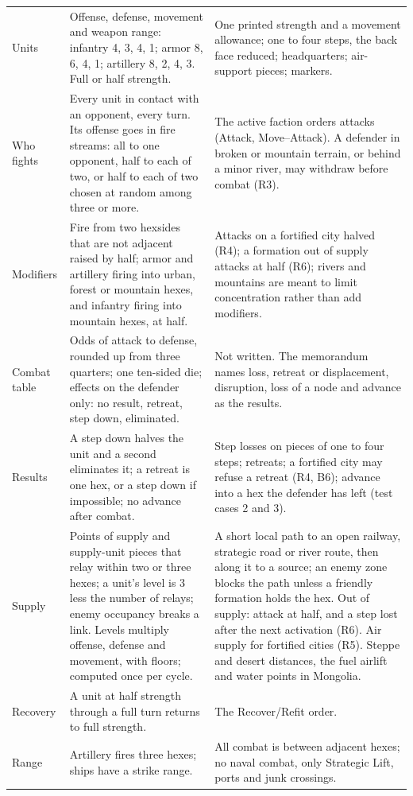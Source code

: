 \documentclass[11pt]{article}
\begin{document}
{\begin{longtable}{@{}>{\raggedright\arraybackslash}p{}>{\raggedright\arraybackslash}p{}>{\raggedright\arraybackslash}p{}@{}}
Units & Offense, defense, movement and weapon range: infantry 4, 3, 4, 1; armor 8, 6, 4, 1; artillery 8, 2, 4, 3. Full or half strength. & One printed strength and a movement allowance; one to four steps, the back face reduced; headquarters; air-support pieces; markers. \\
Who fights & Every unit in contact with an opponent, every turn. Its offense goes in fire streams: all to one opponent, half to each of two, or half to each of two chosen at random among three or more. & The active faction orders attacks (Attack, Move--Attack). A defender in broken or mountain terrain, or behind a minor river, may withdraw before combat (R3). \\
Modifiers & Fire from two hexsides that are not adjacent raised by half; armor and artillery firing into urban, forest or mountain hexes, and infantry firing into mountain hexes, at half. & Attacks on a fortified city halved (R4); a formation out of supply attacks at half (R6); rivers and mountains are meant to limit concentration rather than add modifiers. \\
Combat table & Odds of attack to defense, rounded up from three quarters; one ten-sided die; effects on the defender only: no result, retreat, step down, eliminated. & Not written. The memorandum names loss, retreat or displacement, disruption, loss of a node and advance as the results. \\
Results & A step down halves the unit and a second eliminates it; a retreat is one hex, or a step down if impossible; no advance after combat. & Step losses on pieces of one to four steps; retreats; a fortified city may refuse a retreat (R4, B6); advance into a hex the defender has left (test cases 2 and 3). \\
Supply & Points of supply and supply-unit pieces that relay within two or three hexes; a unit's level is 3 less the number of relays; enemy occupancy breaks a link. Levels multiply offense, defense and movement, with floors; computed once per cycle. & A short local path to an open railway, strategic road or river route, then along it to a source; an enemy zone blocks the path unless a friendly formation holds the hex. Out of supply: attack at half, and a step lost after the next activation (R6). Air supply for fortified cities (R5). Steppe and desert distances, the fuel airlift and water points in Mongolia. \\
Recovery & A unit at half strength through a full turn returns to full strength. & The Recover/Refit order. \\
Range & Artillery fires three hexes; ships have a strike range. & All combat is between adjacent hexes; no naval combat, only Strategic Lift, ports and junk crossings. \\
\end{longtable}
}
\end{document}
